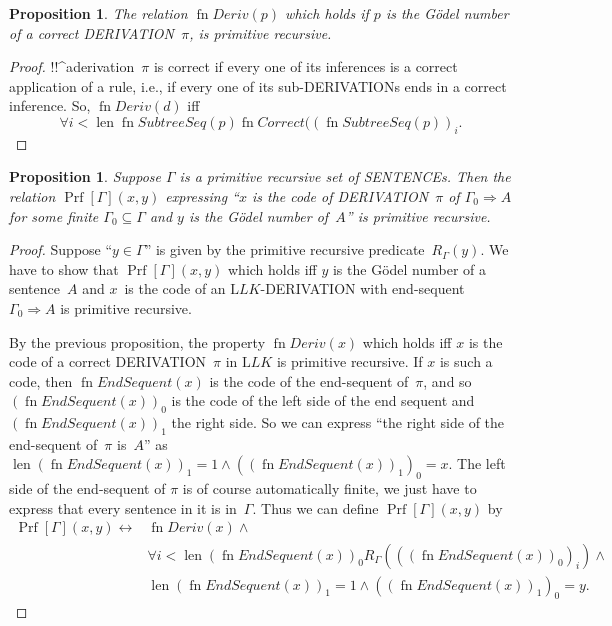 \documentclass[10pt,a4paper]{article}
\newcommand*{\olup}[1]{\MakeUppercase{#1}}
\theoremstyle{plain}
\newtheorem{prop}[thm]{Proposition}
\theoremstyle{definition}
\theoremstyle{remark}
\newcommand*{\ollabel}[1]{\label{#1}}
\providecommand{\Sequent}{\mathrel{\Rightarrow}}
\providecommand{\Log}{\ensuremath{\mathrm{L}}}
\providecommand{\len}{\operatorname{len}}
\providecommand{\Prf}{\operatorname{Prf}}
\providecommand{\bforall}{\forall}
\providecommand{\defiff}{\mathrel{\leftrightarrow}}
\providecommand{\fn}{\operatorname{fn}}
\begin{document}
\begin{prop}
  \ollabel{prop:deriv}
  The relation $\fn{Deriv}(p)$ which holds if $p$ is the G\"odel
  number of a correct \olup{derivation}~$\pi$, is primitive recursive.
\end{prop}

\begin{proof}
  !!^a{derivation}~$\pi$ is correct if every one of its inferences
  is a correct application of a rule, i.e., if every one of its
  sub-\olup{derivation}s ends in a correct inference. So, $\fn{Deriv}(d)$
  iff
  \[
  \bforall{i<\len{\fn{SubtreeSeq}(p)}}{\fn{Correct}((\fn{SubtreeSeq}(p))_i}.
  \]
\end{proof}


\begin{prop}
Suppose $\Gamma$ is a primitive recursive set of \olup{sentence}s.  Then
the relation $\Prf[\Gamma](x, y)$ expressing ``$x$ is the code of
\olup{derivation}~$\pi$ of $\Gamma_0 \Sequent A$ for some finite
$\Gamma_0 \subseteq \Gamma$ and $y$ is the G\"odel number of~$A$'' is
primitive recursive.
\end{prop}

\begin{proof}
Suppose ``$y \in \Gamma$'' is given by the primitive recursive
predicate~$R_\Gamma(y)$.  We have to show that $\Prf[\Gamma](x, y)$
which holds iff $y$ is the G\"odel number of a sentence~$A$ and
$x$~is the code of an $\Log{LK}$-\olup{derivation} with end-sequent
$\Gamma_0 \Sequent A$ is primitive recursive.

By the previous proposition, the property $\fn{Deriv}(x)$ which holds
iff $x$ is the code of a correct \olup{derivation}~$\pi$ in $\Log{LK}$ is
primitive recursive.  If $x$ is such a code, then $\fn{EndSequent}(x)$
is the code of the end-sequent of~$\pi$, and so
$(\fn{EndSequent}(x))_0$ is the code of the left side of the end
sequent and $(\fn{EndSequent}(x))_1$ the right side.  So we can
express ``the right side of the end-sequent of~$\pi$ is~$A$'' as
$\len{(\fn{EndSequent}(x))_1} = 1 \land ((\fn{EndSequent}(x))_1)_0 =
x$.  The left side of the end-sequent of $\pi$ is of course
automatically finite, we just have to express that every sentence in
it is in~$\Gamma$.  Thus we can define $\Prf[\Gamma](x, y)$ by
\begin{align*}
\Prf[\Gamma](x, y) \defiff {}&
\fn{Deriv}(x) \land {} \\
& \bforall{i <
  \len{(\fn{EndSequent}(x))_0}}{R_\Gamma(((\fn{EndSequent}(x))_0)_i)} \land {}\\
& \len{(\fn{EndSequent}(x))_1} = 1 \land ((\fn{EndSequent}(x))_1)_0 = y.
\end{align*}
\end{proof}
\end{document}
